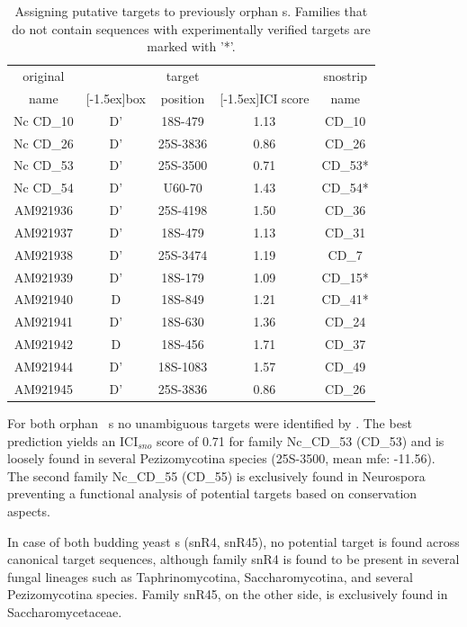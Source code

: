 \begin{table}
  \caption{Assigning putative targets to previously
    orphan \cd s. Families that do not contain sequences with
    experimentally verified targets are marked with '*'. }
  \label{tab:orphan_cd_snoRNAs_short}
  \begin{center}
    \begin{footnotesize}
      \begin{tabular}{c|c|c|c|c}
      original&&target&&snostrip\\
      name&\raisebox{1.5ex}[-1.5ex]{box}&position&\raisebox{1.5ex}[-1.5ex]{ICI
      score}&name\\
  \hline
  Nc CD\_10&D'&18S-479&1.13&CD\_10\\
\hline
  Nc CD\_26&D'&25S-3836&0.86&CD\_26\\
\hline
  Nc CD\_53&D'&25S-3500&0.71&CD\_53*\\
\hline
  Nc CD\_54&D'&U60-70&1.43&CD\_54*\\
 \hline
  AM921936&D'&25S-4198&1.50&CD\_36\\
\hline
  AM921937&D'&18S-479&1.13&CD\_31\\
\hline
  AM921938&D'&25S-3474&1.19&CD\_7\\
\hline
  AM921939&D'&18S-179&1.09&CD\_15*\\
\hline
  AM921940&D&18S-849&1.21&CD\_41*\\
\hline
  AM921941&D'&18S-630&1.36&CD\_24\\
\hline
  AM921942&D&18S-456&1.71&CD\_37\\
\hline
  AM921944&D'&18S-1083&1.57&CD\_49\\
\hline
  AM921945&D'&25S-3836&0.86&CD\_26\\

    \end{tabular}
    \end{footnotesize}
  \end{center} 
\end{table}

For both orphan \ncr\ \sno s no unambiguous targets were identified 
by \snostrip. The best prediction yields an
ICI$_{sno}$ score of 0.71 for family Nc\_CD\_53 (CD\_53) and is
loosely found in several Pezizomycotina species (25S-3500, mean mfe:
-11.56). The second family Nc\_CD\_55 (CD\_55) is exclusively found in
Neurospora preventing a functional analysis of potential targets based
on conservation aspects.

In case of both budding yeast \sno s (snR4, snR45), no potential
target is found across canonical target sequences, although family
snR4 is found to be present in several fungal lineages such as
Taphrinomycotina, Saccharomycotina, and several Pezizomycotina
species. Family snR45, on the other side, is exclusively found in
Saccharomycetaceae.

